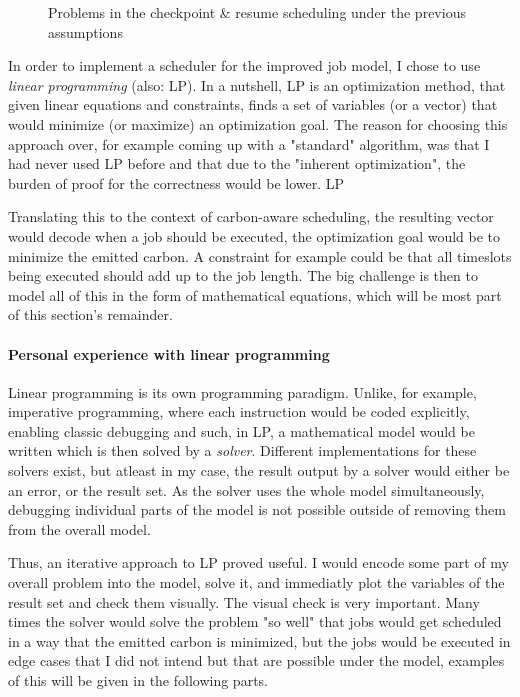 \begin{figure}
    \caption{Problems in the checkpoint \& resume scheduling under the previous assumptions}
    \label{fig:schedule_problems}
\end{figure}


In order to implement a scheduler for the improved job model, I chose to use \emph{linear programming} (also: LP).
In a nutshell, LP is an optimization method, that given linear equations and constraints, finds a set of variables (or a vector) that would minimize (or maximize) an optimization goal. 
The reason for choosing this approach over, for example coming up with a "standard" algorithm, was that I had never used LP before and that due to the "inherent optimization", the burden of proof for the correctness would be lower. LP

Translating this to the context of carbon-aware scheduling, the resulting vector would decode when a job should be executed, the optimization goal would be to minimize the emitted carbon. 
A constraint for example could be that all timeslots being executed should add up to the job length. 
The big challenge is then to model all of this in the form of mathematical equations, which will be most part of this section's remainder.

\paragraph{Personal experience with linear programming}

Linear programming is its own programming paradigm. Unlike, for example, imperative programming, where each instruction would be coded explicitly, enabling classic debugging and such, in LP, a mathematical model would be written which is then solved by a \emph{solver}. 
Different implementations for these solvers exist, but atleast in my case, the result output by a solver would either be an error, or the result set. 
As the solver uses the whole model simultaneously, debugging individual parts of the model is not possible outside of removing them from the overall model.

Thus, an iterative approach to LP proved useful. 
I would encode some part of my overall problem into the model, solve it, and immediatly plot the variables of the result set and check them visually.
The visual check is very important. 
Many times the solver would solve the problem "so well" that jobs would get scheduled in a way that the emitted carbon is minimized, but the jobs would be executed in edge cases that I did not intend but that are possible under the model, examples of this will be given in the following parts.

